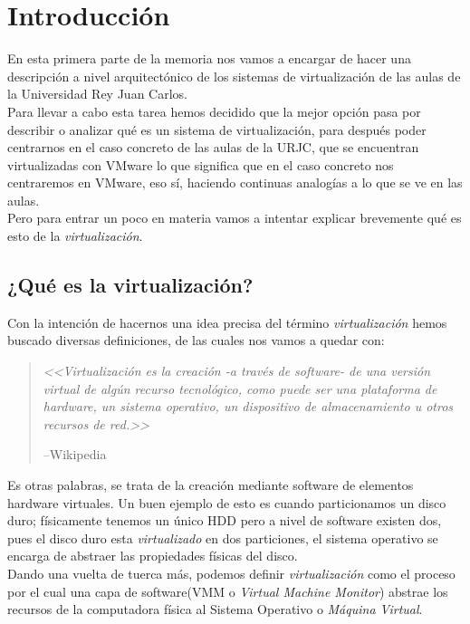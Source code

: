 \chapter{Introducción}
\lettrine[lines=1,slope=4pt,findent=0pt]{E}{}n esta primera parte de la memoria nos vamos a encargar de hacer una descripción a nivel arquitectónico de los sistemas de virtualización de las aulas de la Universidad Rey Juan Carlos.\\

\noindent Para llevar a cabo esta tarea hemos decidido que la mejor opción pasa por describir o analizar qué es un sistema de virtualización, para después poder centrarnos en el caso concreto de las aulas de la URJC, que se encuentran virtualizadas con VMware\cite{vmware} lo que significa que en el caso concreto nos centraremos en VMware, eso sí, haciendo continuas analogías a lo que se ve en las aulas.\\

\noindent Pero para entrar un poco en materia vamos a intentar explicar brevemente qué es esto de la \emph{virtualización}.

\section{¿Qué es la virtualización?}
\noindent Con la intención de hacernos una idea precisa del término \emph{virtualización} hemos buscado diversas definiciones, de las cuales nos vamos a quedar con:
\begin{quote}
\emph{<<Virtualización es la creación -a través de software- de una versión virtual de algún recurso tecnológico, como puede ser una plataforma de hardware, un sistema operativo, un dispositivo de almacenamiento u otros recursos de red.>>}
\begin{flushright}
--Wikipedia\cite{defvirwiki}
\end{flushright}
\end{quote}

\noindent Es otras palabras, se trata de la creación mediante software de elementos hardware virtuales. Un buen ejemplo de esto es cuando particionamos un disco duro; físicamente tenemos un único HDD pero a nivel de software existen dos, pues el disco duro esta \emph{virtualizado} en dos particiones, el sistema operativo se encarga de abstraer las propiedades físicas del disco.\\

\noindent Dando una vuelta de tuerca más, podemos definir \emph{virtualización} como el proceso por el cual una capa de software(VMM o \emph{Virtual Machine Monitor}) abstrae los recursos de la computadora física al Sistema Operativo o \emph{Máquina Virtual}.\\

